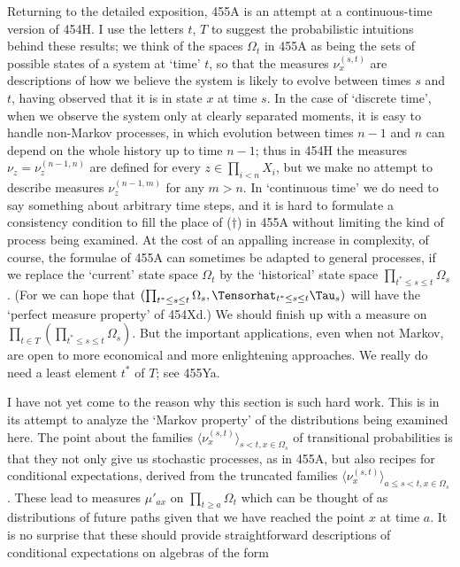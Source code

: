 {Returning to the detailed exposition, 455A is an attempt at a
continuous-time version of 454H.   I
use the letters $t$, $T$ to suggest the probabilistic intuitions behind
these results;  we think of the spaces $\Omega_t$ in 455A as being the sets
of possible states of a system at `time' $t$, so that the measures
$\nu_x^{(s,t)}$ are descriptions of how we believe the system is likely
to evolve between times $s$ and $t$, having observed that
it is in state $x$ at
time $s$.   In the case of `discrete time', when we observe the system
only at clearly separated moments, it is easy to handle non-Markov
processes, in which evolution between times $n-1$ and $n$ can depend on
the whole history up to time $n-1$;  thus in 454H the measures
$\nu_z=\nu_z^{(n-1,n)}$ are defined for every $z\in\prod_{i<n}X_i$, but
we make no attempt to describe measures $\nu_z^{(n-1,m)}$ for any $m>n$.
In `continuous time' we do need to say something about arbitrary time
steps, and it is hard to formulate a consistency condition to fill the
place of ($\dagger$) in 455A without limiting the kind of process being
examined.   At the cost of an appalling increase in complexity, of
course, the formulae of 455A can
sometimes be adapted to general processes, if we
replace the `current' state space $\Omega_t$ by the `historical' state
space $\prod_{t^*\le s\le t}\Omega_s$.
(For we can hope that
$(\prod_{t^*\le s\le t}\Omega_s,\Tensorhat_{t^*\le s\le t}\Tau_s)$
will have the
`perfect measure property' of 454Xd.)   We should finish up with a
measure on $\prod_{t\in T}(\prod_{t^*\le s\le t}\Omega_s)$.
But the important
applications, even when not Markov, are open to more economical and more
enlightening approaches.
We really do need a least element $t^*$ of $T$;  see 455Ya.

I have not yet come to the reason why this section is such hard work.
This is in its attempt to analyze the `Markov property' of the
distributions being examined here.   The point about the families
$\langle\nu^{(s,t)}_x\rangle_{s<t,x\in\Omega_s}$ of transitional
probabilities is that they not only give us stochastic processes, as in
455A, but also recipes for conditional expectations, derived from the
truncated families $\langle\nu^{(s,t)}_x\rangle_{a\le s<t,x\in\Omega_s}$.
These lead to measures $\mu'_{ax}$ on $\prod_{t\ge a}\Omega_t$
which can be thought of as distributions of future paths given
that we have reached the point $x$ at time $a$.   It is no surprise that
these should
provide straightforward descriptions of conditional expectations on
algebras of the form

}
